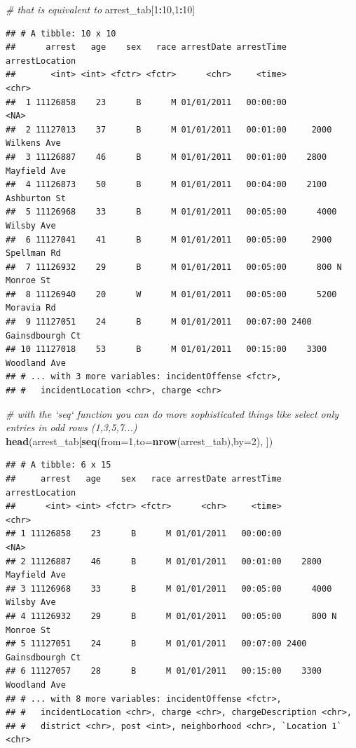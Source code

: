 \documentclass[]{book}
\newenvironment{Shaded}{\begin{snugshade}}{\end{snugshade}}
\newcommand{\KeywordTok}[1]{\textcolor[rgb]{0.13,0.29,0.53}{\textbf{#1}}}
\newcommand{\DataTypeTok}[1]{\textcolor[rgb]{0.13,0.29,0.53}{#1}}
\newcommand{\DecValTok}[1]{\textcolor[rgb]{0.00,0.00,0.81}{#1}}
\newcommand{\CommentTok}[1]{\textcolor[rgb]{0.56,0.35,0.01}{\textit{#1}}}
\newcommand{\OperatorTok}[1]{\textcolor[rgb]{0.81,0.36,0.00}{\textbf{#1}}}
\newcommand{\NormalTok}[1]{#1}
\theoremstyle{definition}
\theoremstyle{definition}
\theoremstyle{remark}
\begin{document}
\begin{Shaded}
\begin{Highlighting}[]
\CommentTok{# that is equivalent to }
\NormalTok{arrest_tab[}\DecValTok{1}\OperatorTok{:}\DecValTok{10}\NormalTok{,}\DecValTok{1}\OperatorTok{:}\DecValTok{10}\NormalTok{]}
\end{Highlighting}
\end{Shaded}

\begin{verbatim}
## # A tibble: 10 x 10
##      arrest   age    sex   race arrestDate arrestTime       arrestLocation
##       <int> <int> <fctr> <fctr>      <chr>     <time>                <chr>
##  1 11126858    23      B      M 01/01/2011   00:00:00                 <NA>
##  2 11127013    37      B      M 01/01/2011   00:01:00     2000 Wilkens Ave
##  3 11126887    46      B      M 01/01/2011   00:01:00    2800 Mayfield Ave
##  4 11126873    50      B      M 01/01/2011   00:04:00    2100 Ashburton St
##  5 11126968    33      B      M 01/01/2011   00:05:00      4000 Wilsby Ave
##  6 11127041    41      B      M 01/01/2011   00:05:00     2900 Spellman Rd
##  7 11126932    29      B      M 01/01/2011   00:05:00      800 N Monroe St
##  8 11126940    20      W      M 01/01/2011   00:05:00      5200 Moravia Rd
##  9 11127051    24      B      M 01/01/2011   00:07:00 2400 Gainsdbourgh Ct
## 10 11127018    53      B      M 01/01/2011   00:15:00    3300 Woodland Ave
## # ... with 3 more variables: incidentOffense <fctr>,
## #   incidentLocation <chr>, charge <chr>
\end{verbatim}

\begin{Shaded}
\begin{Highlighting}[]
\CommentTok{# with the `seq` function you can do more sophisticated things like select only entries in odd rows (1,3,5,7...)}
\KeywordTok{head}\NormalTok{(arrest_tab[}\KeywordTok{seq}\NormalTok{(}\DataTypeTok{from=}\DecValTok{1}\NormalTok{,}\DataTypeTok{to=}\KeywordTok{nrow}\NormalTok{(arrest_tab),}\DataTypeTok{by=}\DecValTok{2}\NormalTok{), ])}
\end{Highlighting}
\end{Shaded}

\begin{verbatim}
## # A tibble: 6 x 15
##     arrest   age    sex   race arrestDate arrestTime       arrestLocation
##      <int> <int> <fctr> <fctr>      <chr>     <time>                <chr>
## 1 11126858    23      B      M 01/01/2011   00:00:00                 <NA>
## 2 11126887    46      B      M 01/01/2011   00:01:00    2800 Mayfield Ave
## 3 11126968    33      B      M 01/01/2011   00:05:00      4000 Wilsby Ave
## 4 11126932    29      B      M 01/01/2011   00:05:00      800 N Monroe St
## 5 11127051    24      B      M 01/01/2011   00:07:00 2400 Gainsdbourgh Ct
## 6 11127057    28      B      M 01/01/2011   00:15:00    3300 Woodland Ave
## # ... with 8 more variables: incidentOffense <fctr>,
## #   incidentLocation <chr>, charge <chr>, chargeDescription <chr>,
## #   district <chr>, post <int>, neighborhood <chr>, `Location 1` <chr>
\end{verbatim}
\end{document}

